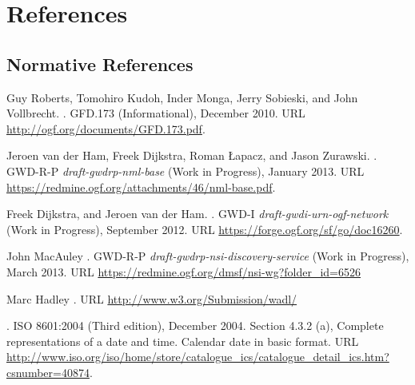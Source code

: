 %
\section*{References}%
\label{s:references}
% 
\renewcommand{\refname}{}

\subsection*{Normative References}
\begin{thebibliography}{10}
\vspace*{-3em}
Guy Roberts, Tomohiro Kudoh, Inder Monga, Jerry Sobieski, and John Vollbrecht.
.
\newblock GFD.173 (Informational), December 2010.
\newblock URL \url{http://ogf.org/documents/GFD.173.pdf}.

Jeroen van der Ham, Freek Dijkstra, Roman Łapacz, and Jason Zurawski.
.
\newblock GWD-R-P \emph{draft-gwdrp-nml-base} (Work in Progress), January 2013.
\newblock URL \url{https://redmine.ogf.org/attachments/46/nml-base.pdf}.

Freek Dijkstra, and Jeroen van der Ham.
.
\newblock GWD-I \emph{draft-gwdi-urn-ogf-network} (Work in Progress), September 2012.
\newblock URL \url{https://forge.ogf.org/sf/go/doc16260}.

John MacAuley
.
\newblock GWD-R-P \emph{draft-gwdrp-nsi-discovery-service} (Work in Progress), March 2013.
\newblock URL \url{https://redmine.ogf.org/dmsf/nsi-wg?folder_id=6526} %

Marc Hadley
.
\newblock URL \url{http://www.w3.org/Submission/wadl/}

.
\newblock ISO 8601:2004 (Third edition), December 2004.
\newblock Section 4.3.2 (a), Complete representations of a date and time. Calendar date in basic format.
\newblock URL \url{http://www.iso.org/iso/home/store/catalogue_ics/catalogue_detail_ics.htm?csnumber=40874}.


\end{thebibliography}
